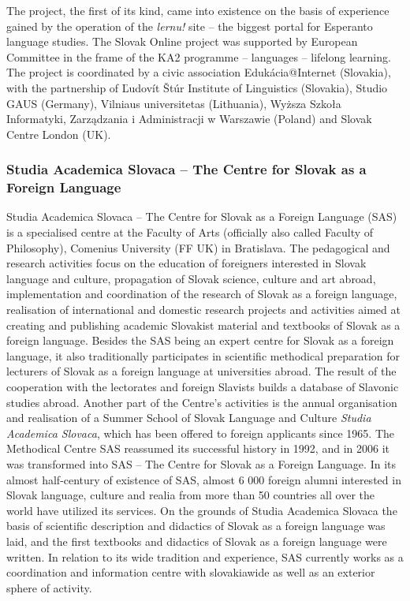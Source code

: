 \begin{multicols}{2}
The project, the first of its kind, came into existence on the basis of experience gained by the operation of the \emph{lernu!}\cite{f7} site – the biggest portal for Esperanto language studies. The Slovak Online project was supported by European Committee in the frame of the KA2 programme – languages – lifelong learning. The project is coordinated by a civic association Edukácia@Internet (Slovakia), with the partnership of Ľudovít Štúr Institute of Linguistics (Slovakia), Studio GAUS (Germany), Vilniaus universitetas (Lithuania), Wyższa Szkoła Informatyki, Zarządzania i Administracji w Warszawie (Poland) and Slovak Centre London (UK).

\subsubsection{Studia Academica Slovaca -- The Centre for Slovak as a Foreign Language}
Studia Academica Slovaca – The Centre for Slovak as a Foreign Language (SAS) is a specialised centre at the Faculty of Arts (officially also called Faculty of Philosophy), Comenius University (FF UK) in Bratislava. The pedagogical and research activities focus on the education of foreigners interested in Slovak language and culture, propagation of Slovak science, culture and art abroad, implementation and coordination of the research of Slovak as a foreign language, realisation of international and domestic research projects and activities aimed at creating and publishing academic Slovakist material and textbooks of Slovak as a foreign language. Besides the SAS being an expert centre for Slovak as a foreign language, it also traditionally participates in scientific methodical preparation for lecturers of Slovak as a foreign language at universities abroad. The result of the cooperation with the lectorates and foreign Slavists builds a database of Slavonic studies abroad.
Another part of the Centre's activities is the annual organisation and realisation of a Summer School of Slovak Language and Culture \emph{Studia Academica Slovaca}, which has been offered to foreign applicants since 1965. The Methodical Centre SAS reassumed its successful history in 1992, and in 2006 it was transformed into SAS – The Centre for Slovak as a Foreign Language. In its almost half-century of existence of SAS, almost 6 000 foreign alumni interested in Slovak language, culture and realia from more than 50 countries all over the world have  utilized its services. On the grounds of Studia Academica Slovaca the basis of scientific description and didactics of Slovak as a foreign language was laid, and the first textbooks and didactics of Slovak as a foreign language were written. In relation to its wide tradition and experience, SAS currently works as a coordination and information centre with slovakiawide as well as an exterior sphere of activity.


\end{multicols}
